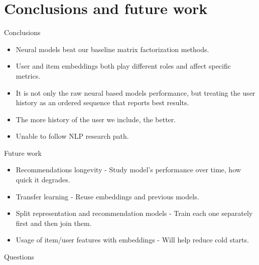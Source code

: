 \documentclass{beamer}
\begin{document}
\section{Conclusions and future work}
\begin{frame}{Conclusions}

\begin{itemize}
    \item Neural models beat our baseline matrix factorization methods.
    \item User and item embeddings both play different roles and affect specific metrics. 
    \item It is not only the raw neural based models performance, but treating the user history as an ordered sequence that reports best results.
    \item The more history of the user we include, the better.
    \item Unable to follow NLP research path.
\end{itemize}
\end{frame}
\begin{frame}{Future work}
\begin{itemize}
    \item Recommendations longevity - Study model's performance over time, how quick it degrades.
    \item Transfer learning - Reuse embeddings and previous models.
    \item Split representation and recommendation models - Train each one separately first and then join them.
    \item Usage of item/user features with embeddings - Will help reduce cold starts.
\end{itemize}

\end{frame}

\begin{frame}
\Huge{\centerline{Questions}}
\end{frame}
\end{document}

